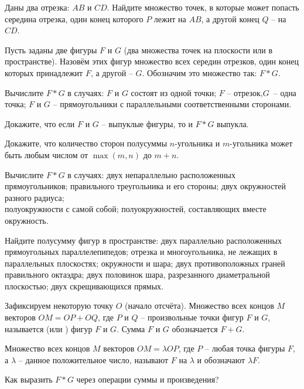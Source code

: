 \documentclass[a4paper,12pt]{article}
\begin{document}
	

 Даны два отрезка: $AB$ и $CD$. Найдите множество точек, в которые может попасть середина отрезка, один конец которого $P$ лежит на $AB$, а другой конец $Q$ -- на $CD$.

 Пусть заданы две фигуры $F$ и $G$ (два множества точек на плоскости или в пространстве). Назовём  этих фигур множество всех середин отрезков, один конец которых принадлежит $F$, а другой -- $G$. Обозначим это множество так: $F*G$.

 Вычислите $F*G$ в случаях:  $F$ и $G$ состоят из одной точки;  $F$ -- отрезок,\break $G$~-- одна точка;  $F$ и $G$ -- прямоугольники с параллельными соответственными сторонами.

 Докажите, что если $F$ и $G$ -- выпуклые фигуры, то и $F*G$ выпукла.

 Докажите, что количество сторон полусуммы $n$-угольника и $m$-угольника может быть любым числом от $\max(m,n)$ до $m+n$.

 Вычислите $F*G$ в случаях:  двух непараллельно расположенных прямоугольников;  правильного треугольника и его стороны;  двух окружностей разного радиуса;\\  полуокружности с самой собой;  полуокружностей, составляющих вместе окружность.

 Найдите полусумму фигур в пространстве:  двух параллельно расположенных прямоугольных параллелепипедов;  отрезка и многоугольника, не лежащих в параллельных плоскостях;  окружности и шара;  двух противоположных граней правильного октаэдра;  двух половинок шара, разрезанного диаметральной плоскостью;  двух скрещивающихся прямых.





 Зафиксируем некоторую точку $O$ (начало отсчёта). Множество всех концов $M$ векторов $OM=OP+OQ$, где $P$ и $Q$ -- произвольные точки фигур $F$ и $G$, называется  (или ) фигур $F$ и $G$. Сумма $F$ и $G$ обозначается $F+G$.

 Множество всех концов $M$ векторов $OM=\lambda OP$, где $P$ -- любая точка фигуры $F$, а $\lambda$ -- данное положительное число, называют  $F$ на $\lambda$ и обозначают $\lambda F$.

 Как выразить $F*G$ через операции суммы и произведения?
\end{document}
